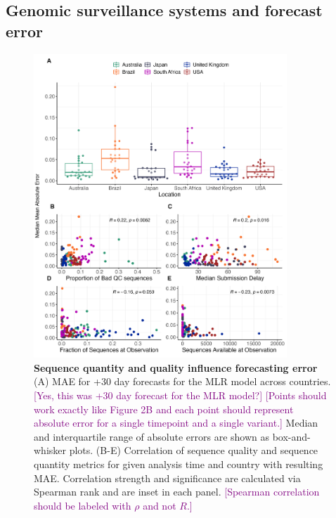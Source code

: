 \documentclass[11pt,oneside,letterpaper]{article}
\def\tbc#1{\textcolor{purple}{[#1]}}
\begin{document}
\subsection*{Genomic surveillance systems and forecast error}

\begin{figure}[tb!]
	\centering
    \includegraphics[width=0.85\textwidth]{figures/Var_of_interest.png}
	\caption{
		\textbf{Sequence quantity and quality influence forecasting error}
    (A) MAE for +30 day forecasts for the MLR model across countries.
		\tbc{Yes, this was +30 day forecast for the MLR model?}
    \tbc{Points should work exactly like Figure 2B and each point should represent absolute error for a single timepoint and a single variant.}
		Median and interquartile range of absolute errors are shown as box-and-whisker plots.
		(B-E) Correlation of sequence quality and sequence quantity metrics for given analysis time and country with resulting MAE.
    Correlation strength and significance are calculated via Spearman rank and are inset in each panel.
		\tbc{Spearman correlation should be labeled with $\rho$ and not $R$.}
	}
	\label{fig:vars_of_interest}
\end{figure}
\end{document}
